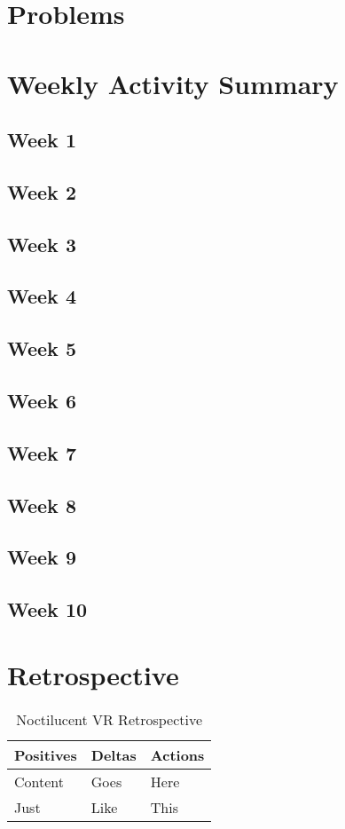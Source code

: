 \documentclass{article}
\begin{document}
\section{Problems}

\section{Weekly Activity Summary}
\subsection{Week 1}

\subsection{Week 2}

\subsection{Week 3}

\subsection{Week 4}

\subsection{Week 5}

\subsection{Week 6}

\subsection{Week 7}

\subsection{Week 8}

\subsection{Week 9}

\subsection{Week 10}

\section{Retrospective}

\begin{table}[ht]
\caption{Noctilucent VR Retrospective}
\centering
\begin{tabular}{l l l}
\hline\hline
Positives & Deltas & Actions \\ [0.5ex]
\hline
Content & Goes & Here \\
Just & Like & This \\ [1ex]
\hline
\end{tabular}
\end{table}
\end{document}

